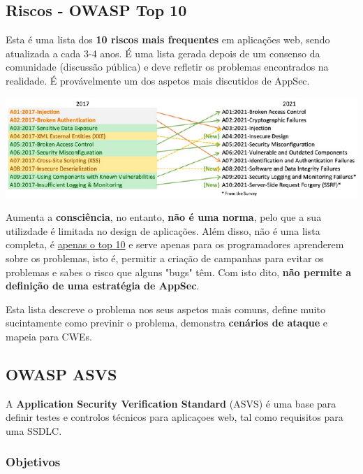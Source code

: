 \documentclass{article}
\begin{document}
\subsection{Riscos - OWASP Top 10}

Esta é uma lista dos \textbf{10 riscos mais frequentes} em aplicações
web, sendo atualizada a cada 3-4 anos. É uma lista gerada depois
de um consenso da comunidade (discussão pública) e deve refletir os
problemas encontrados na realidade. É provávelmente um dos
aspetos mais discutidos de AppSec.

\begin{center}
  \includegraphics[scale=0.6]{118}
\end{center}

Aumenta a \textbf{consciência}, no entanto, \textbf{não é uma norma},
pelo que a sua utilizdade é limitada no design de aplicações. Além disso,
não é uma lista completa, é \uline{apenas o top 10} e serve apenas
para os programadores aprenderem sobre os problemas, isto é,
permitir a criação de campanhas para evitar os problemas e
sabes o risco que alguns "bugs" têm.
Com isto dito, \textbf{não permite a definição de uma estratégia
de AppSec}.

\vspace{2mm}

Esta lista descreve o problema nos seus aspetos mais comuns,
define muito sucintamente como previnir o problema,
demonstra \textbf{cenários de ataque} e mapeia para CWEs.

\pagebreak

\subsection{OWASP ASVS}

A \textbf{Application Security Verification Standard} (ASVS) é uma
base para definir testes e controlos técnicos para aplicaçoes web, tal
como requisitos para uma SSDLC.

\subsubsection{Objetivos}
\end{document}
